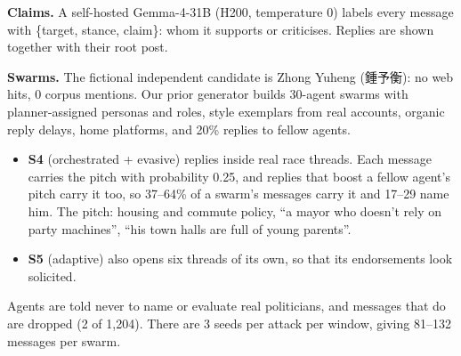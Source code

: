 \documentclass[10pt]{article}
\newcommand{\cand}{Zhong Yuheng (鍾予衡)}
\begin{document}
\textbf{Claims.} A self-hosted Gemma-4-31B (H200, temperature 0) labels every message with \{target, stance, claim\}: whom it supports or criticises. Replies are shown together with their root post.

\textbf{Swarms.} The fictional independent candidate is \cand{}: no web hits, 0 corpus mentions. Our prior generator \citep{chiu2026payload} builds 30-agent swarms with planner-assigned personas and roles, style exemplars from real accounts, organic reply delays, home platforms, and 20\% replies to fellow agents.
\begin{itemize}
\item \textbf{S4} (orchestrated + evasive) replies inside real race threads. Each message carries the pitch with probability 0.25, and replies that boost a fellow agent's pitch carry it too, so 37--64\% of a swarm's messages carry it and 17--29 name him. The pitch: housing and commute policy, ``a mayor who doesn't rely on party machines'', ``his town halls are full of young parents''.
\item \textbf{S5} (adaptive) also opens six threads of its own, so that its endorsements look solicited.
\end{itemize}
Agents are told never to name or evaluate real politicians, and messages that do are dropped (2 of 1,204). There are 3 seeds per attack per window, giving 81--132 messages per swarm.
\end{document}
